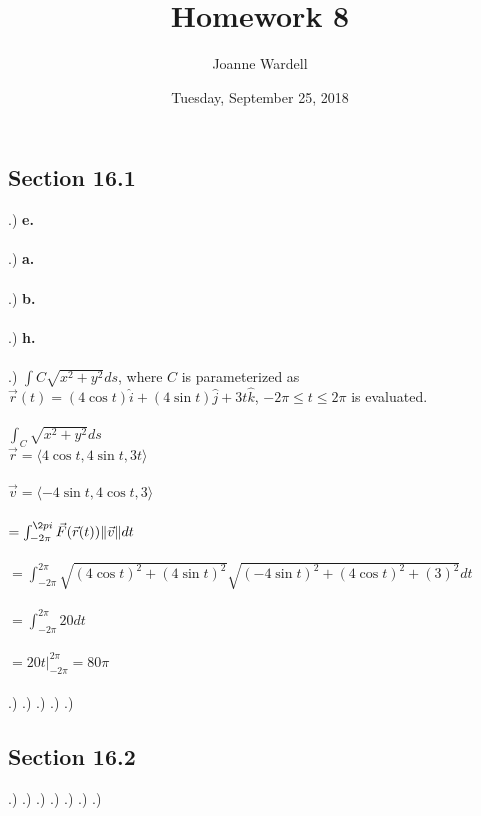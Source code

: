 \documentclass[12pt]{article}
\title{\vspace{-2.0cm}Homework 8}
\author{Joanne Wardell}
\date{Tuesday, September 25, 2018}
\begin{document}
\maketitle
\subsection*{Section 16.1}
.) \textbf{e.}\\\\
.) \textbf{a.}\\\\
.) \textbf{b.}\\\\
.) \textbf{h.}\\\\
.) $\int{C}\sqrt{x^{2} + y^{2}}ds$, where  $C$ is parameterized as $\vec{r}(t) = (4\cos{t})\hat{i} +
(4\sin{t})\hat{j} + 3t\hat{k}$, \hspace{10pt} $-2\pi \leq t \leq 2\pi$ is evaluated.\\\\
\noindent $\int_{C}\sqrt{x^{2} + y^{2}}ds$\\
\noindent $\vec{r} = \langle 4\cos{t}, 4\sin{t}, 3t\rangle$\\\\
\noindent $\vec{v} = \langle -4\sin{t}, 4\cos{t}, 3 \rangle$\\\\
\noindent $= \int_{-2\pi}^{\2pi}\vec{F}(\vec{r}(t))  \| \vec{v} \| dt$\\\\
\noindent $ = \int_{-2\pi}^{2\pi} \sqrt{(4\cos{t})^{2} + (4\sin{t})^{2}} \sqrt{(-4\sin{t})^{2} 
+ (4\cos{t})^{2} + (3)^{2}}dt$\\\\
\noindent $ = \int_{-2\pi}^{2\pi}20dt$\\\\
\noindent $ = 20t\Big|_{-2\pi}^{2\pi} = 80\pi$\\\\
.)
.) 
.)
.)
.)



\subsection*{Section 16.2}
.) 
.)
.)
.)
.)
.)
.)
\end{document}
